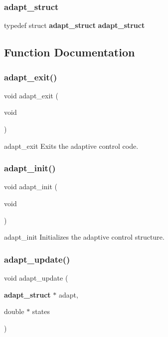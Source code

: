 \subsubsection{adapt\+\_\+struct}
{\footnotesize\ttfamily typedef struct \textbf{ adapt\+\_\+struct}  \textbf{ adapt\+\_\+struct}}



\subsection{Function Documentation}
\mbox{\label{adapt_8h_a2fe8f1b4c9bcdfeec1db1d6009019961}} 
\subsubsection{adapt\+\_\+exit()}
{\footnotesize\ttfamily void adapt\+\_\+exit (\begin{DoxyParamCaption}\item[{void}]{ }\end{DoxyParamCaption})}

adapt\+\_\+exit Exits the adaptive control code. \mbox{\label{adapt_8h_ae064612259be9bffa6840e25cfa0b0d9}} 
\subsubsection{adapt\+\_\+init()}
{\footnotesize\ttfamily void adapt\+\_\+init (\begin{DoxyParamCaption}\item[{void}]{ }\end{DoxyParamCaption})}

adapt\+\_\+init Initializes the adaptive control structure. \mbox{\label{adapt_8h_a384336c7e7cea8ea046140fc861b596f}} 
\subsubsection{adapt\+\_\+update()}
{\footnotesize\ttfamily void adapt\+\_\+update (\begin{DoxyParamCaption}\item[{\textbf{ adapt\+\_\+struct} $\ast$}]{adapt,  }\item[{double $\ast$}]{states }\end{DoxyParamCaption})}

